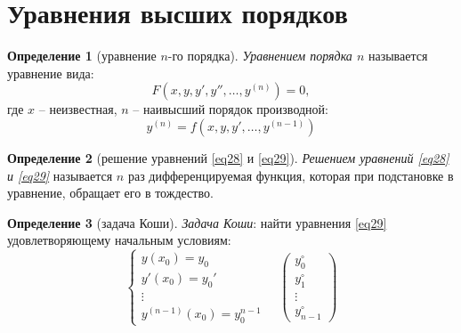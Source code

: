 \documentclass[11pt,a4paper,oneside]{report}
\theoremstyle{definition}
\newtheorem{definition}{Определение}[section]
\theoremstyle{plain}
\theoremstyle{remark}
\begin{document}
\section{Уравнения высших порядков}

\begin{definition}[уравнение $n$-го порядка]
    \emph{Уравнением порядка $n$} называется уравнение вида:
    \begin{equation}\label{eq28}
        F(x,y,y',y'',\ldots,y^{(n)}) = 0,
    \end{equation}
    где $x$ -- неизвестная, $n$ -- наивысший порядок производной:
    \begin{equation}\label{eq29}
        y^{(n)} = f(x,y,y',\ldots,y^{(n-1)})
    \end{equation}
\end{definition}

\begin{definition}[решение уравнений \ref{eq28} и \ref{eq29}]
    \emph{Решением уравнений \ref{eq28} и \ref{eq29}} называется $n$ раз дифференцируемая функция, которая при подстановке в уравнение, обращает его в тождество.
\end{definition}

\begin{definition}[задача Коши]
    \emph{Задача Коши}: найти уравнения \ref{eq29} удовлетворяющему начальным условиям:
    \begin{equation}\label{eq30}
        \left\{\begin{array}{l}
            y(x_0) = y_0   \\
            y'(x_0) = y_0' \\
            \vdots         \\
            y^{(n-1)}(x_0) = y_0^{n-1}
        \end{array}\right. \quad \left(\begin{matrix}
                y_0^\circ \\ y_1^\circ \\ \vdots \\ y_{n-1}^\circ
            \end{matrix}\right)
    \end{equation}
\end{definition}
\end{document}
